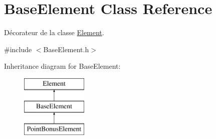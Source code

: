 \hypertarget{classBaseElement}{\section{Base\-Element Class Reference}
\label{classBaseElement}
}


Décorateur de la classe \hyperlink{classElement}{Element}.  




{\ttfamily \#include $<$Base\-Element.\-h$>$}

Inheritance diagram for Base\-Element\-:\begin{figure}[H]
\begin{center}
\leavevmode
\includegraphics[height=3.000000cm]{classBaseElement}
\end{center}
\end{figure}

